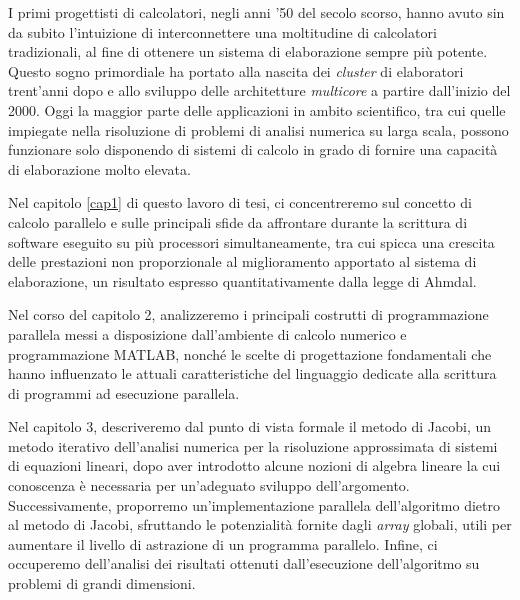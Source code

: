 I primi progettisti di calcolatori, negli anni '50 del secolo scorso, hanno avuto sin da subito l'intuizione di interconnettere
una moltitudine di calcolatori tradizionali, al fine di ottenere un sistema di elaborazione sempre più potente.\newline
Questo sogno primordiale ha portato alla nascita dei \textit{cluster} di elaboratori trent'anni dopo e allo sviluppo delle architetture
\textit{multicore} a partire dall'inizio del 2000.\newline
Oggi la maggior parte delle applicazioni in ambito scientifico, tra cui quelle impiegate nella risoluzione di problemi di analisi numerica
su larga scala, possono funzionare solo disponendo di sistemi di calcolo in grado di fornire una capacità di elaborazione molto elevata.

Nel capitolo \ref{cap1} di questo lavoro di tesi, ci concentreremo sul concetto di calcolo parallelo e sulle principali sfide da affrontare
durante la scrittura di software eseguito su più processori simultaneamente, tra cui spicca una crescita delle prestazioni non proporzionale
al miglioramento apportato al sistema di elaborazione, un risultato espresso quantitativamente dalla legge di Ahmdal.

Nel corso del capitolo 2, analizzeremo i principali costrutti di programmazione parallela messi a disposizione dall’ambiente di calcolo numerico
e programmazione MATLAB\textsuperscript{\textregistered}, nonché le scelte di progettazione fondamentali che hanno influenzato
le attuali caratteristiche del linguaggio dedicate alla scrittura di programmi ad esecuzione parallela.

Nel capitolo 3, descriveremo dal punto di vista formale il metodo di Jacobi, un metodo iterativo dell’analisi numerica per la risoluzione
approssimata di sistemi di equazioni lineari, dopo aver introdotto alcune nozioni di algebra lineare la cui conoscenza è necessaria per un'adeguato
sviluppo dell'argomento.\newline
Successivamente, proporremo un’implementazione parallela dell'algoritmo dietro al metodo di Jacobi, sfruttando le potenzialità fornite
dagli \textit{array} globali, utili per aumentare il livello di astrazione di un programma parallelo.\newline
Infine, ci occuperemo dell’analisi dei risultati ottenuti dall’esecuzione dell’algoritmo su problemi di grandi dimensioni.
